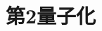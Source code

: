 \documentclass{report}
\begin{document}
  \maketitle
  \tableofcontents
  \section{第2量子化}
    
\end{document}
